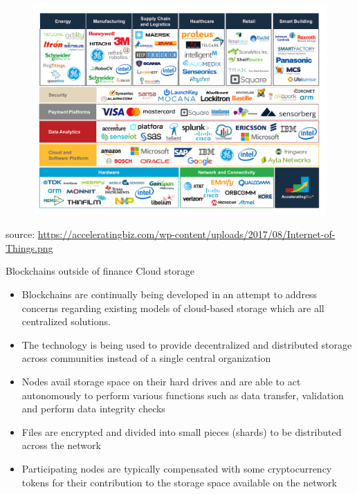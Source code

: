 \documentclass[10pt]{beamer}
\begin{document}
\begin{frame}
	\begin{figure}[]
		\centering
		\includegraphics  [scale=0.2]{Images/iot-ecosystem1}
	\end{figure}
	\begin{scriptsize}
		source: \href{https://acceleratingbiz.com/proof-point/internet-things-iot-overview-selected-devices/}{https://acceleratingbiz.com/wp-content/uploads/2017/08/Internet-of-Things.png}
	\end{scriptsize}
\end{frame}


\begin{frame}{Blockchains outside of finance}
	Cloud storage
	\begin{itemize}
		\item Blockchains are continually being developed in an attempt to address concerns regarding existing models of cloud-based storage which are all centralized solutions.
		\item The technology is being used to provide decentralized and distributed storage across communities instead of a single central organization
		\item Nodes avail storage space on their hard drives and are able to act autonomously to perform various functions such as data transfer, validation and perform data integrity checks
		\item Files are encrypted and divided into small pieces (shards) to be distributed across the network
		\item Participating nodes are typically compensated with some cryptocurrency tokens for their contribution to the storage space available on the network
	\end{itemize}
\end{frame}
\end{document}
